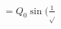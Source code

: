 \documentclass[preview]{standalone}
\begin{document}
\begin{align*}
= Q_0 \sin(\frac{1}{\sqrt}
\end{align*}
\end{document}
